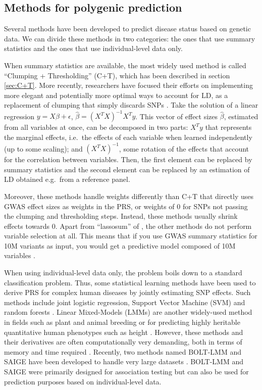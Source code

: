 \subsection{Methods for polygenic prediction}

Several methods have been developed to predict disease status based on genetic data.
We can divide these methods in two categories: the ones that use summary statistics and the ones that use individual-level data only.

When summary statistics are available, the most widely used method is called ``Clumping + Thresholding'' (C+T), which has been described in section \ref{sec:C+T}.
More recently, researchers have focused their efforts on implementing more elegant and potentially more optimal ways to account for LD, as a replacement of clumping that simply discards SNPs \cite[]{vilhjalmsson2015modeling,mak2017polygenic,chun2019non,ge2019polygenic}. 
Take the solution of a linear regression $y = X \beta + \epsilon$, $\hat{\beta} = \left(X^T X\right)^{-1} X^T y$. This vector of effect sizes $\hat{\beta}$, estimated from all variables at once, can be decomposed in two parts: $X^T y$ that represents the marginal effects, i.e.\ the effects of each variable when learned independently (up to some scaling); and $\left(X^T X\right)^{-1}$, some rotation of the effects that account for the correlation between variables.
Then, the first element can be replaced by summary statistics and the second element can be replaced by an estimation of LD obtained e.g.\ from a reference panel.

Moreover, these methods handle weights differently than C+T that directly uses GWAS effect sizes as weights in the PRS, or weights of 0 for SNPs not passing the clumping and thresholding steps. Instead, these methods usually shrink effects towards 0. 
Apart from ``lassosum'' of \cite{mak2017polygenic}, the other methods do not perform variable selection at all. This means that if you use GWAS summary statistics for 10M variants as input, you would get a predictive model composed of 10M variables \cite[]{janssens2019polygenic}.

When using individual-level data only, the problem boils down to a standard classification problem. Thus, some statistical learning methods have been used to derive PRS for complex human diseases by jointly estimating SNP effects. Such methods include joint logistic regression, Support Vector Machine (SVM) and random forests \cite[]{wei2009disease,abraham2012sparsnp,abraham2014accurate,botta2014exploiting,okser2014regularized}.
Linear Mixed-Models (LMMs) are another widely-used method in fields such as plant and animal breeding or for predicting highly heritable quantitative human phenotypes such as height \cite[]{yang2010common}. 
However, these methods and their derivatives are often computationally very demanding, both in terms of memory and time required \cite[]{zhou2013polygenic,golan2014effective,speed2014multiblup,maier2015joint}.
Recently, two methods named BOLT-LMM and SAIGE have been developed to handle very large datasets \cite[]{loh2018mixed,zhou2018efficiently}. 
BOLT-LMM and SAIGE were primarily designed for association testing but can also be used for prediction purposes based on individual-level data.

